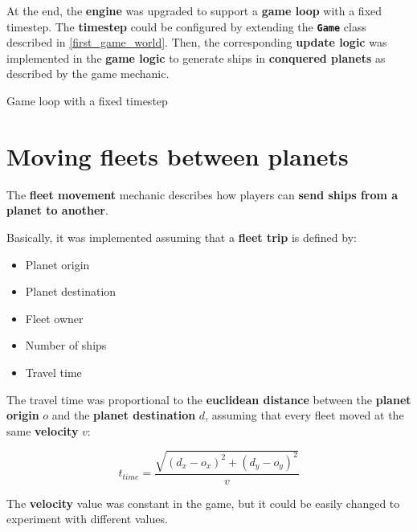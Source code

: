 \documentclass[a4paper,11pt,titlepage,abstract,numbers=noenddot,automark,mnsy,intlimits,rgb,dvipsnames]{report}
\begin{document}
At the end, the \textbf{engine} was upgraded to support a \textbf{game loop} with a fixed timestep. The \textbf{timestep} could be configured
by extending the \textbf{\texttt{Game}} class described in \autoref{first_game_world}. Then, the corresponding \textbf{update logic} was
implemented in the \textbf{game logic} to generate ships in \textbf{conquered planets} as described by the game mechanic.
\begin{algorithm}
\caption{Game loop with a fixed timestep}
\label{game_loop}
\begin{algorithmic}
\ENDWHILE
\ENDWHILE
\end{algorithmic}
\end{algorithm}
\section{Moving fleets between planets}
The \textbf{fleet movement} mechanic describes how players can \textbf{send ships from a planet to another}.

Basically, it was implemented assuming that a \textbf{fleet trip} is defined by:
\begin{itemize}
\item
Planet origin
\item
Planet destination
\item
Fleet owner
\item
Number of ships
\item
Travel time
\end{itemize}
The travel time was proportional to the \textbf{euclidean distance} between the \textbf{planet origin} $o$ and the \textbf{planet destination} $d$,
assuming that every fleet moved at the same \textbf{velocity} $v$:

$$t_{time} = \frac{\sqrt{(d_x - o_x)^2 + (d_y - o_y)^2}}{v}$$

The \textbf{velocity} value was constant in the game, but it could be easily changed to experiment with different values.
\end{document}
